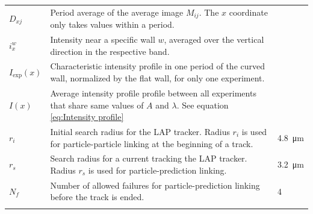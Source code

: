 \begin{table}[!h]
\begin{tabularx}{\textwidth}{lXl}
         $D_{xj}$ & Period average of the average image $M_{ij}$. The $x$ coordinate only takes values within a period.  & \quad \\
         $i_{x}^w$ & Intensity near a specific wall $w$, averaged over the vertical direction in the respective band.  & \quad \\
         $I_{\text{exp}}(x)$ & Characteristic intensity profile in one period of the curved wall, normalized by the flat wall, for only one experiment.   & \quad \\
         $I(x)$ & Average intensity profile profile between all experiments that share same values of $A$ and $\lambda$. See equation \eqref{eq:Intensity profile}    & \quad \\
         $r_i$ & Initial search radius for the LAP tracker. Radius $r_i$ is used for particle-particle linking at the beginning of a track.   & \SI{4.8}{\micro \meter} \\
         $r_s$ & Search radius for a current tracking the LAP tracker. Radius $r_s$ is used for particle-prediction linking.    & \SI{3.2}{\micro \meter} \\
         $N_f$ & Number of allowed failures for particle-prediction linking before the track is ended. & 4 \\
    \hline\noalign{\smallskip}
    \end{tabularx}
    \label{table:image analysis parameters}
\end{table}
